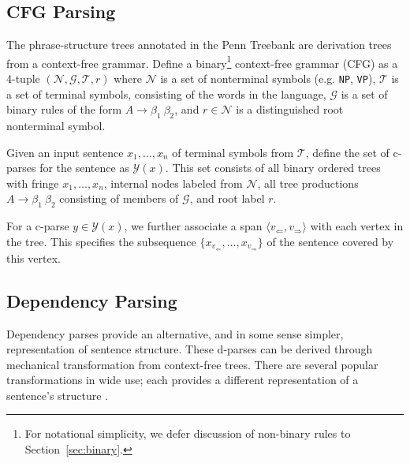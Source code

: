 \documentclass[11pt,letterpaper]{article}
\newcommand{\nonterms}{\mathcal{N}}
\newcommand{\rules}{\mathcal{G}}
\newcommand{\terms}{\mathcal{T}}
\newcommand{\Span}[1]{\langle #1 \rangle}
\newcommand{\Tag}[1]{\texttt{#1}}
\newcommand{\Root}{r}
\newcommand{\Rule}[3]{#1 \rightarrow #2\ #3}
\begin{document}

\subsection{CFG Parsing}

The phrase-structure trees annotated in the Penn Treebank are derivation trees from a context-free grammar. 
Define a binary\footnote{For notational simplicity, we defer discussion of non-binary rules to Section~\ref{sec:binary}.} context-free grammar (CFG) as a 4-tuple $(\nonterms, \rules, \terms, \Root)$ where $\nonterms$ is a set of nonterminal symbols (e.g. \Tag{NP},
  \Tag{VP}), $\terms$ is a set of terminal symbols, consisting of the
  words in the language, $\rules$ is a set of binary rules
  of the form $\Rule{A}{\beta_1}{\beta_2}$, and  $\Root \in \nonterms$ is  a distinguished root nonterminal symbol.


Given an input sentence $x_1, \ldots, x_n$ of terminal symbols from
$\terms$, define the set of c-parses for the sentence as
$\mathcal{Y}(x)$. This set consists of all binary ordered trees with
fringe $x_1, \ldots, x_n$, internal nodes labeled from $\nonterms$,
all tree productions $\Rule{A}{\beta_1}{\beta_2}$ consisting of members of
$\rules$, and root label $\Root$.

For a c-parse $y \in \mathcal{Y}(x)$,
we further associate a span $\Span{v_{\Leftarrow}, v_{\Rightarrow}}$ with each vertex in the tree. This specifies the 
subsequence $\{x_{v_{\Leftarrow}}, \ldots, x_{v_{\Rightarrow}}\}$ of the sentence covered by this vertex.


\subsection{Dependency Parsing}

Dependency parses provide an alternative, and in some sense simpler,
representation of sentence structure. These d-parses can be derived
through mechanical transformation from context-free trees.  There are
several popular transformations in wide use; each provides a different
representation of a sentence's structure
\cite{collins2003head,de2008stanford,yamada2003statistical,johansson2007extended}.
\end{document}
